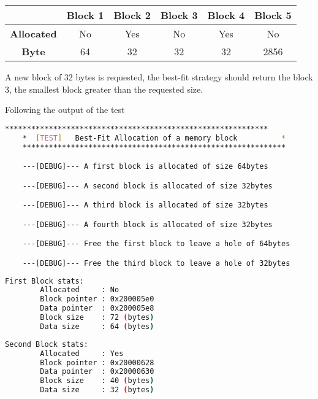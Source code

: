     \begin{table}[h]
    \centering
    \begin{tabular}{|c|c|c|c|c|c|}
    \hline
    & \textbf{Block 1} & \textbf{Block 2} & \textbf{Block 3} & \textbf{Block 4} & \textbf{Block 5} \\
    \hline
    \textbf{Allocated} & No & Yes & No & Yes & No \\
    \textbf{Byte} & 64 & 32 & 32 & 32 & 2856 \\
    \hline
    \end{tabular}
    \end{table}

    A new block of 32 bytes is requested, the best-fit strategy should return the block 3, the smallest block greater than the requested size.

    Following the output of the test

    \begin{outputbox}
    \begin{lstlisting}[language=bash]
    ************************************************************
    *  [TEST]   Best-Fit Allocation of a memory block          *
    ************************************************************

    ---[DEBUG]--- A first block is allocated of size 64bytes

    ---[DEBUG]--- A second block is allocated of size 32bytes

    ---[DEBUG]--- A third block is allocated of size 32bytes

    ---[DEBUG]--- A fourth block is allocated of size 32bytes

    ---[DEBUG]--- Free the first block to leave a hole of 64bytes

    ---[DEBUG]--- Free the third block to leave a hole of 32bytes
    \end{lstlisting}
    \end{outputbox}

    \begin{outputbox}
    \begin{lstlisting}[language=bash]
    First Block stats:
        Allocated     : No
        Block pointer : 0x200005e0
        Data pointer  : 0x200005e8
        Block size    : 72 (bytes)
        Data size     : 64 (bytes)
    \end{lstlisting}
    \end{outputbox}

    \begin{outputbox}
    \begin{lstlisting}[language=bash]
    Second Block stats:
        Allocated     : Yes
        Block pointer : 0x20000628
        Data pointer  : 0x20000630
        Block size    : 40 (bytes)
        Data size     : 32 (bytes)
    \end{lstlisting}
    \end{outputbox}

